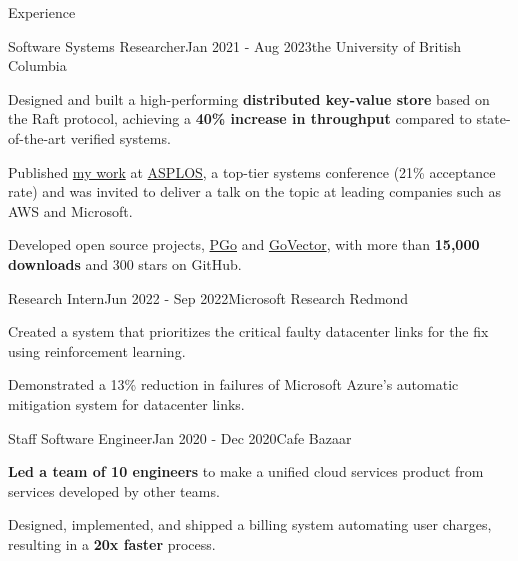 \documentclass[
	10pt, %
]{resume} %
\begin{document}
\begin{rSection}{Experience}

  \begin{rSubsection}{Software Systems Researcher}{Jan 2021 - Aug 2023}{\textnormal{the} University of British Columbia}{}

    \item Designed and built a high-performing \textbf{distributed key-value store} based
      on the Raft protocol, achieving a \textbf{40\% increase in throughput} compared to 
      state-of-the-art verified systems.

    \item Published \href{https://dl.acm.org/doi/10.1145/3575693.3575695}{my work} 
      at \href{https://asplos-conference.org/}{ASPLOS}, a top-tier systems
      conference (21\% acceptance rate) and was
      invited to deliver a talk on the topic at leading companies such as AWS and
      Microsoft.

    \item Developed open source projects, \href{https://github.com/DistCompiler/pgo}{PGo} 
      and \href{https://github.com/DistributedClocks/GoVector}{GoVector}, with
      more than \textbf{15,000 downloads} and 300 stars on GitHub.

	\end{rSubsection}

  \begin{rSubsection}{Research Intern}{Jun 2022 - Sep 2022}{Microsoft Research Redmond}{}

    \item Created a system that prioritizes the critical faulty datacenter links
      for the fix using reinforcement learning.

    \item Demonstrated a 13\% reduction in failures of Microsoft Azure's automatic
    mitigation system for datacenter links. 

	\end{rSubsection}

  \begin{rSubsection}{Staff Software Engineer}{Jan 2020 - Dec 2020}{Cafe Bazaar}{}

    \item \textbf{Led a team of 10 engineers} to make a uniﬁed cloud services product
      from services developed by other teams.

    \item Designed, implemented, and shipped a billing system automating user
      charges, resulting in a \textbf{20x faster} process.


\end{rSubsection}
\end{rSection}
\end{document}
